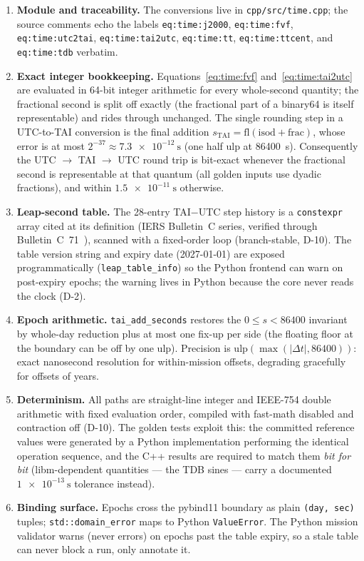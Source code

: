 \begin{enumerate}
  \item \textbf{Module and traceability.} The conversions live in
    \texttt{cpp/src/time.cpp}; the source comments echo the labels
    \texttt{eq:time:j2000}, \texttt{eq:time:fvf}, \texttt{eq:time:utc2tai},
    \texttt{eq:time:tai2utc}, \texttt{eq:time:tt}, \texttt{eq:time:ttcent},
    and \texttt{eq:time:tdb} verbatim.
  \item \textbf{Exact integer bookkeeping.} Equations~\eqref{eq:time:fvf}
    and~\eqref{eq:time:tai2utc} are evaluated in 64-bit integer arithmetic
    for every whole-second quantity; the fractional second is split off
    exactly (the fractional part of a binary64 is itself representable) and
    rides through unchanged. The single rounding step in a UTC-to-TAI
    conversion is the final addition
    $s_{\mathrm{TAI}} = \mathrm{fl}(\mathrm{isod} + \mathrm{frac})$, whose
    error is at most $2^{-37} \approx \qty{7.3e-12}{\second}$ (one half ulp
    at \qty{86400}{\second}). Consequently the UTC
    $\rightarrow$ TAI $\rightarrow$ UTC round trip is bit-exact whenever
    the fractional second is representable at that quantum (all golden
    inputs use dyadic fractions), and within
    $\qty{1.5e-11}{\second}$ otherwise.
  \item \textbf{Leap-second table.} The 28-entry TAI$-$UTC step history is
    a \texttt{constexpr} array cited at its definition (IERS Bulletin~C
    series, verified through Bulletin~C~71~\cite{iersbc71}), scanned with a
    fixed-order loop (branch-stable, D-10). The table version string and
    expiry date (2027-01-01) are exposed programmatically
    (\texttt{leap\_table\_info}) so the Python frontend can warn on
    post-expiry epochs; the warning lives in Python because the core never
    reads the clock (D-2).
  \item \textbf{Epoch arithmetic.} \texttt{tai\_add\_seconds} restores the
    $0 \leq s < 86400$ invariant by whole-day reduction plus at most one
    fix-up per side (the floating floor at the boundary can be off by one
    ulp). Precision is $\mathrm{ulp}(\max(|\Delta t|, 86400))$: exact
    nanosecond resolution for within-mission offsets, degrading gracefully
    for offsets of years.
  \item \textbf{Determinism.} All paths are straight-line integer and
    IEEE-754 double arithmetic with fixed evaluation order, compiled with
    fast-math disabled and contraction off (D-10). The golden tests
    exploit this: the committed reference values were generated by a
    Python implementation performing the identical operation sequence,
    and the C++ results are required to match them \emph{bit for bit}
    (libm-dependent quantities --- the TDB sines --- carry a documented
    $\qty{1e-13}{\second}$ tolerance instead).
  \item \textbf{Binding surface.} Epochs cross the pybind11 boundary as
    plain \texttt{(day, sec)} tuples; \texttt{std::domain\_error} maps to
    Python \texttt{ValueError}. The Python mission validator warns (never
    errors) on epochs past the table expiry, so a stale table can never
    block a run, only annotate it.
\end{enumerate}

